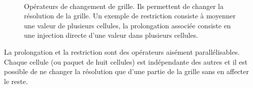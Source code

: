 \begin{figure}[htbp]
\begin{center}
\\
\caption{Opérateurs de changement de grille. 
Ils permettent de changer la résolution de la grille. Un exemple de restriction consiste à moyenner une valeur de plusieurs cellules, la prolongation associée consiste en une injection directe d'une valeur dans plusieurs cellules.}
\label{Opérateurs de changement de grille}
\end{center}
\end{figure}

La prolongation et la restriction sont des opérateurs aisément parallélisables. Chaque cellule (ou paquet de huit cellules) est indépendante des autres et il est possible de ne changer la résolution que d'une partie de la grille sans en affecter le reste.\\

